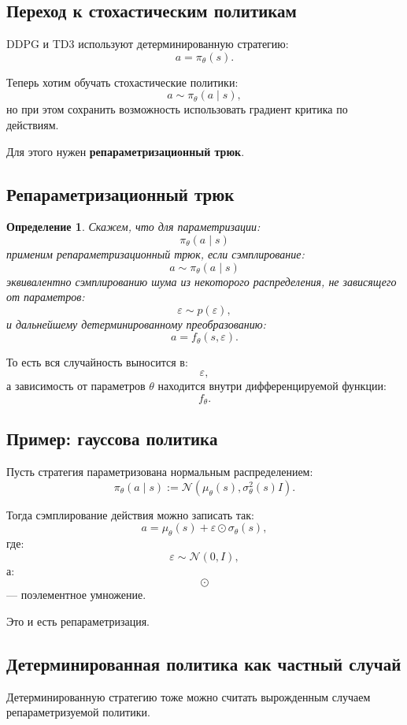 \documentclass[12pt,a4paper]{article}
\newtheorem{definition}{Определение}
\begin{document}
\subsection{Переход к стохастическим политикам}

DDPG и TD3 используют детерминированную стратегию:
\[
a=\pi_\theta(s).
\]

Теперь хотим обучать стохастические политики:
\[
a\sim\pi_\theta(a\mid s),
\]
но при этом сохранить возможность использовать градиент критика по действиям.

Для этого нужен \textbf{репараметризационный трюк}.

\subsection{Репараметризационный трюк}

\begin{definition}
Скажем, что для параметризации:
\[
\pi_\theta(a\mid s)
\]
применим репараметризационный трюк, если сэмплирование:
\[
a\sim\pi_\theta(a\mid s)
\]
эквивалентно сэмплированию шума из некоторого распределения, не зависящего от параметров:
\[
\varepsilon\sim p(\varepsilon),
\]
и дальнейшему детерминированному преобразованию:
\[
a=f_\theta(s,\varepsilon).
\]
\end{definition}

То есть вся случайность выносится в:
\[
\varepsilon,
\]
а зависимость от параметров $\theta$ находится внутри дифференцируемой функции:
\[
f_\theta.
\]

\subsection{Пример: гауссова политика}

Пусть стратегия параметризована нормальным распределением:
\[
\pi_\theta(a\mid s)
:=
\mathcal N
\left(
\mu_\theta(s),
\sigma_\theta^2(s)I
\right).
\]

Тогда сэмплирование действия можно записать так:
\[
a
=
\mu_\theta(s)
+
\varepsilon\odot\sigma_\theta(s),
\]
где:
\[
\varepsilon\sim\mathcal N(0,I),
\]
а:
\[
\odot
\]
--- поэлементное умножение.

Это и есть репараметризация.

\subsection{Детерминированная политика как частный случай}

Детерминированную стратегию тоже можно считать вырожденным случаем репараметризуемой политики.
\end{document}
